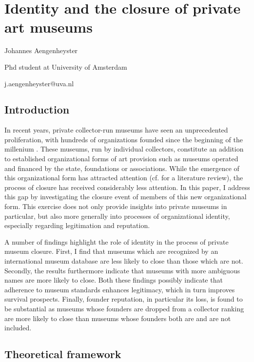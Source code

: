 \documentclass[12pt]{article}
\author{Johannes }
\date{\today}
\title{}
\begin{document}
\section*{Identity and the closure of private art museums}

Johannes Aengenheyster

\noindent
Phd student at University of Amsterdam

\noindent
j.aengenheyster@uva.nl


\subsection*{Introduction}


In recent years, private collector-run museums have seen an unprecedented proliferation, with hundreds of organizations founded since the beginning of the millenium \parencite{Velthuis_etal_2023_boom,LarrysList_2015_report}.
These museums, run by individual collectors, constitute an addition to established organizational forms of art provision such as museums operated and financed by the state, foundations or associations.
While the emergence of this organizational form has attracted attention (cf. \cite{Kolbe_etal_2022_privatemuseum} for a literature review), the process of closure has received considerably less attention.
In this paper, I address this gap by investigating the closure event of members of this new organizational form.
This exercise does not only provide insights into private museums in particular, but also more generally into processes of organizational identity, especially regarding legitimation and reputation. 


A number of findings highlight the role of identity in the process of private museum closure. 
First, I find that museums which are recognized by an international museum database are less likely to close than those which are not.
Secondly, the results furthermore indicate that museums with more ambiguous names are more likely to close.
Both these findings possibly indicate that adherence to museum standards enhances legitimacy, which in turn improves survival prospects.
Finally, founder reputation, in particular its loss, is found to be substantial as museums whose founders are dropped from a collector ranking are more likely to close than museums whose founders both are and are not included.




\subsection*{Theoretical framework}
\end{document}

